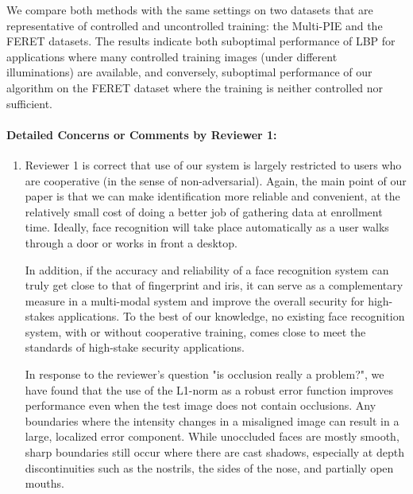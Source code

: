 \documentclass[11pt]{article}
\begin{document}
We compare both methods with the same settings on two datasets that are representative of controlled and uncontrolled training: the Multi-PIE and the FERET
datasets.  The results indicate both suboptimal performance of LBP for applications where many controlled training images (under different illuminations) are available, and conversely, suboptimal performance of our algorithm on the FERET dataset where the training is neither controlled nor sufficient.

\paragraph{Detailed Concerns or Comments by Reviewer 1:} \begin{enumerate}
\item Reviewer 1 is correct that use of our system is largely restricted to
users who are cooperative (in the sense of non-adversarial). Again, the main
point of our paper is that we can make identification more reliable and
convenient, at the relatively small cost of doing a better job of gathering
data at enrollment time.  Ideally, face recognition will take place
automatically as a user walks through a door or works in front a desktop.

In addition, if the accuracy and reliability of a face recognition system can
truly get close to that of fingerprint and iris, it can serve as a
complementary measure in a multi-modal system and improve the overall security
for high-stakes applications. To the best of our knowledge, no existing face
recognition system, with or without cooperative training, comes close to meet
the standards of high-stake security applications.

In response to the reviewer's question "is occlusion really a problem?", we have found that the use of
the L1-norm as a robust error function improves performance even when the test
image does not contain occlusions.  Any boundaries where the intensity changes
in a misaligned image can result in a large, localized error component.  While
unoccluded faces are mostly smooth, sharp boundaries still occur where there
are cast shadows, especially at depth discontinuities such as the nostrils, the
sides of the nose, and partially open mouths.


\end{enumerate}
\end{document}
